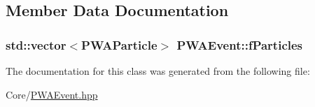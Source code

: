 \subsection{Member Data Documentation}
\hypertarget{classPWAEvent_aac928bac7991d55225c0219c4c9ddf7a}{
\subsubsection[{fParticles}]{\setlength{\rightskip}{0pt plus 5cm}std::vector$<${\bf PWAParticle}$>$ {\bf PWAEvent::fParticles}}}
\label{dc/d66/classPWAEvent_aac928bac7991d55225c0219c4c9ddf7a}


The documentation for this class was generated from the following file:\begin{DoxyCompactItemize}
\item 
Core/\hyperlink{PWAEvent_8hpp}{PWAEvent.hpp}\end{DoxyCompactItemize}
